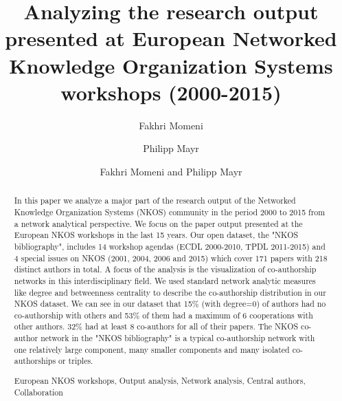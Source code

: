 \documentclass[runningheads,a4paper]{llncs}
\newcommand{\keywords}[1]{\par\addvspace\baselineskip
\noindent\keywordname\enspace\ignorespaces#1}
\begin{document}
\mainmatter  %

\title{Analyzing the research output presented at European Networked Knowledge Organization Systems workshops (2000-2015)}



%
%
\author{Fakhri Momeni%
	\and Philipp Mayr}
%

\author{Fakhri Momeni and Philipp Mayr}

%
%

\maketitle


\begin{abstract}		
In this paper we analyze a major part of the research output of the Networked Knowledge Organization Systems (NKOS) community in the period 2000 to 2015 from a network analytical perspective. We focus on the paper output presented at the European NKOS workshops in the last 15 years. Our open dataset, the "NKOS bibliography", includes 14 workshop agendas (ECDL 2000-2010, TPDL 2011-2015) and 4 special issues on NKOS (2001, 2004, 2006 and 2015) which cover 171 papers with 218 distinct authors in total. A focus of the analysis is the visualization of co-authorship networks in this interdisciplinary field. We used standard network analytic measures like degree and betweenness centrality to describe the co-authorship distribution in our NKOS dataset.  We can see in our dataset that 15\% (with degree=0) of authors had no co-authorship with others and 53\% of them had a maximum of 6 cooperations with other authors. 32\% had at least 8 co-authors for all of their papers. The NKOS co-author network in the "NKOS bibliography" is a typical co-authorship network with one relatively large component, many smaller components and many isolated co-authorships or triples.

 
\keywords{European NKOS workshops, Output analysis, Network analysis, Central authors, Collaboration}
\end{abstract}
\end{document}
